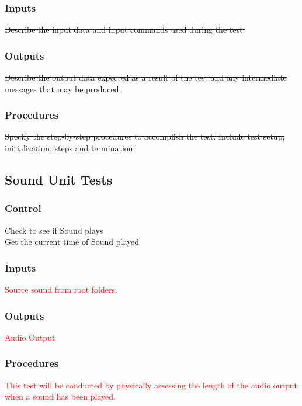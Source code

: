 \documentclass[11pt, oneside]{article}   	%
\begin{document}
\subsubsection{Inputs}
\sout{Describe the input data and input commands used during the test.}

\subsubsection{Outputs}
\sout{Describe the output data expected as a result of the test and any intermediate messages that may be produced.}

\subsubsection{Procedures}
\sout{Specify the step-by-step procedures to accomplish the test. Include test setup, initialization, steps and termination.}


\subsection{Sound Unit Tests}
\subsubsection{Control}
Check to see if Sound plays \\
Get the current time of Sound played

\subsubsection{Inputs}
\textcolor{red}{Source sound from root folders.}

\subsubsection{Outputs}
\textcolor{red}{Audio Output}

\subsubsection{Procedures}
\textcolor{red}{This test will be conducted by physically assessing the length of the audio output when a sound has been played.}
\end{document}
